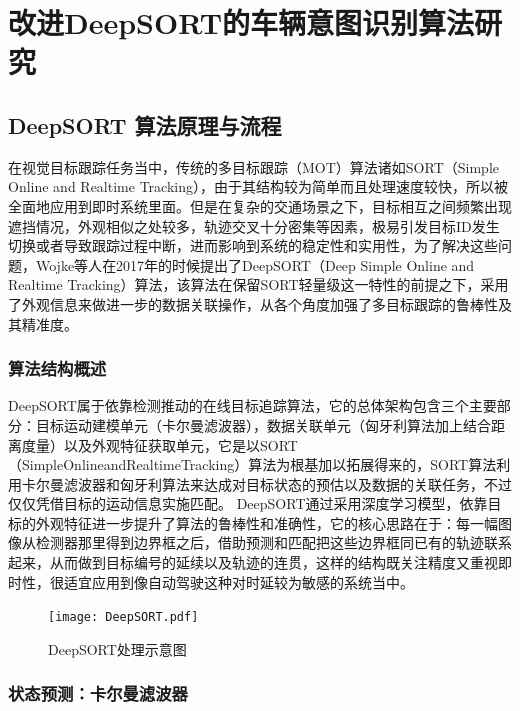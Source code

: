 \chapter{改进DeepSORT的车辆意图识别算法研究}

\section{DeepSORT 算法原理与流程}

在视觉目标跟踪任务当中，传统的多目标跟踪（MOT）算法诸如SORT（Simple Online and Realtime Tracking），由于其结构较为简单而且处理速度较快，所以被全面地应用到即时系统里面。但是在复杂的交通场景之下，目标相互之间频繁出现遮挡情况，外观相似之处较多，轨迹交叉十分密集等因素，极易引发目标ID发生切换或者导致跟踪过程中断，进而影响到系统的稳定性和实用性，为了解决这些问题，Wojke等人\cite{Wojke2017DeepSORT}在2017年的时候提出了DeepSORT（Deep Simple Online and Realtime Tracking）算法，该算法在保留SORT轻量级这一特性的前提之下，采用了外观信息来做进一步的数据关联操作，从各个角度加强了多目标跟踪的鲁棒性及其精准度。

\subsection{算法结构概述}

DeepSORT属于依靠检测推动的在线目标追踪算法，它的总体架构包含三个主要部分：目标运动建模单元（卡尔曼滤波器），数据关联单元（匈牙利算法加上结合距离度量）以及外观特征获取单元，它是以SORT（SimpleOnlineandRealtimeTracking）算法为根基加以拓展得来的，SORT算法利用卡尔曼滤波器和匈牙利算法来达成对目标状态的预估以及数据的关联任务，不过仅仅凭借目标的运动信息实施匹配。 DeepSORT通过采用深度学习模型，依靠目标的外观特征进一步提升了算法的鲁棒性和准确性，它的核心思路在于：每一幅图像从检测器那里得到边界框之后，借助预测和匹配把这些边界框同已有的轨迹联系起来，从而做到目标编号的延续以及轨迹的连贯，这样的结构既关注精度又重视即时性，很适宜应用到像自动驾驶这种对时延较为敏感的系统当中。

\begin{figure}[H]
	\centering
	\texttt{[image: DeepSORT.pdf]}  %
	\caption{DeepSORT处理示意图}
	\label{fig:example_image}  %
\end{figure}

\subsection{状态预测：卡尔曼滤波器}

